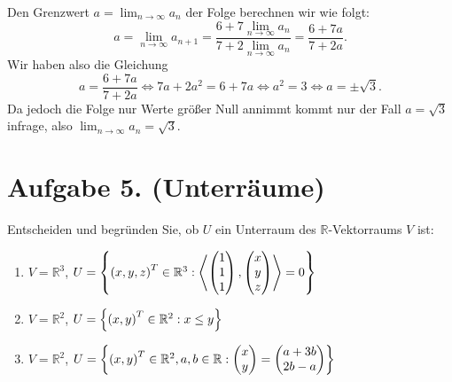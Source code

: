 \documentclass[german,12pt]{homework}
\newcommand{\RR}{\mathbb{R}}
\newcommand{\dotproduct}[2]{\left\langle#1, #2\right\rangle}
\DeclarePairedDelimiter{\enbrace}{(}{)}
\DeclarePairedDelimiter{\penbrace}{\{}{\}}
\begin{document}
\begin{enumerate}
        Den Grenzwert \(a = \lim_{n \to \infty}a_n\) der Folge berechnen wir wie folgt:
        \[a = \lim_{n \to \infty}a_{n + 1} = \frac{6 + 7\lim_{n \to \infty}a_n}{7 + 2\lim_{n \to \infty}a_n} = \frac{6 + 7a}{7 + 2a}.\]
        Wir haben also die Gleichung
        \[a = \frac{6 + 7a}{7 + 2a} \iff 7a + 2a^2 = 6 + 7a \iff a^2 = 3 \iff a = \pm\sqrt{3}.\]
        Da jedoch die Folge nur Werte größer Null annimmt kommt nur der Fall \(a = \sqrt{3}\) infrage, also \(\lim_{n \to \infty}a_n = \sqrt{3}\).
    \end{enumerate}

    \section*{Aufgabe 5. (Unterräume)}

    \begin{problem}
        Entscheiden und begründen Sie, ob \(U\) ein Unterraum des \(\RR\)-Vektorraums \(V\) ist:
        \begin{enumerate}
            \item \(V = \RR^3\), \quad \(U = \penbrace*{\enbrace*{x, y, z}^T \in \RR^3 : \dotproduct{\begin{pmatrix}1\\1\\1\end{pmatrix}}{\begin{pmatrix}x\\y\\z\end{pmatrix}} = 0}\)
            \item \(V = \RR^2\), \quad \(U = \penbrace*{\enbrace*{x, y}^T \in \RR^2 : x \le y}\)
            \item \(V = \RR^2\), \quad \(U = \penbrace*{\enbrace*{x, y}^T \in \RR^2, a, b \in \RR : \begin{pmatrix}x\\y\end{pmatrix} = \begin{pmatrix}a + 3b\\2b - a\end{pmatrix}}\)
        \end{enumerate}
    \end{problem}
\end{document}
